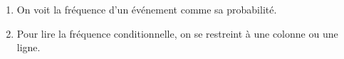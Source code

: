 \begin{proprietes*}{}{}
	\begin{enumerate}[label=$\bullet$]
		\item On voit la fréquence d'un événement comme sa probabilité.
		\item Pour lire la fréquence conditionnelle, on se restreint à une colonne ou une ligne.
	\end{enumerate}
\end{proprietes*}


